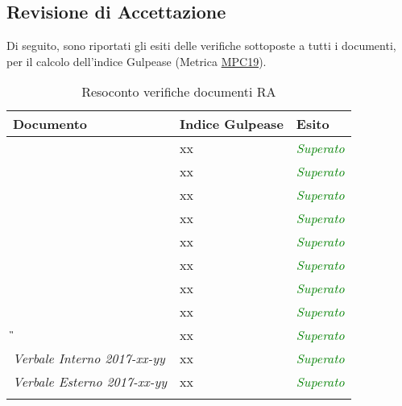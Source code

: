 \newpage
\subsection{Revisione di Accettazione}
Di seguito, sono riportati gli esiti delle verifiche sottoposte a tutti i documenti, per il calcolo dell’indice Gulpease (Metrica \hyperlink{MPC19}{MPC19}).

\begin{longtable}{|>{\centering\arraybackslash}p{5.7cm}|>{\centering\arraybackslash}p{5cm} | >{\centering\arraybackslash}p{5cm}|}
	\hline
	\rowcolor{Gray}
	\textbf{Documento} & \textbf{Indice Gulpease} & \textbf{Esito} \\
	\hline
	\textit{\DDP} & xx & \textcolor{Green}{\textit{Superato}}\\
	\hline
	\textit{\MU} & xx & \textcolor{Green}{\textit{Superato}}\\
	\hline
	\textit{\MS} & xx & \textcolor{Green}{\textit{Superato}}\\
	\hline
	\textit{\ST} & xx  & \textcolor{Green}{\textit{Superato}}\\
	\hline
	\textit{\NdP} & xx  & \textcolor{Green}{\textit{Superato}}\\
	\hline
	\textit{\PdP} & xx & \textcolor{Green}{\textit{Superato}} \\
	\hline
	\textit{\PdQ} &  xx & \textcolor{Green}{\textit{Superato}}\\
	\hline
	\textit{\AdR} &  xx & \textcolor{Green}{\textit{Superato}} \\
	\hline
	\textit{\G}& xx & \textcolor{Green}{\textit{Superato}}\\
	\hline
	\textit{Verbale Interno 2017-xx-yy}		& 	xx	&	\textcolor{Green}{\textit{Superato}}	\\
	\hline
	\textit{Verbale Esterno 2017-xx-yy}		& 	xx	&	\textcolor{Green}{\textit{Superato}}	\\
	\hline
	
	\caption{Resoconto verifiche documenti RA}
\end{longtable}

